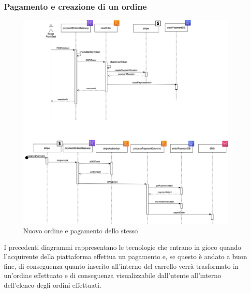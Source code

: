 \subsubsection{Pagamento e creazione di un ordine}
\begin{figure}[H]
	\centering
	\includegraphics[scale=0.5]{Immagini/Backend/Diagrammiseq.png}
	\caption{Nuovo ordine e pagamento dello stesso}
	\label{fig:Diagrammiseq}
\end{figure}
I precedenti diagrammi rappresentano le tecnologie che entrano in gioco quando l'acquirente della piattaforma effettua un pagamento e, se questo è andato a buon fine, di conseguenza quanto inserito all'interno del carrello verrà trasformato in un'ordine effettuato e di conseguenza visualizzabile dall'utente all'interno dell'elenco degli ordini effettuati.